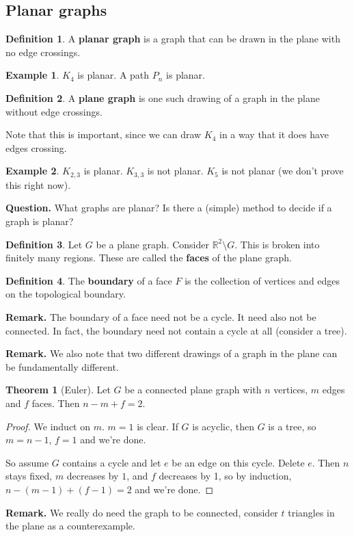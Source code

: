 \documentclass{article}
\theoremstyle{definition}
\newtheorem{theorem}{Theorem}[section]
\newtheorem{example}{Example}[section]
\newtheorem{defn}{Definition}[section]
\begin{document}

\subsection{Planar graphs}

\begin{defn}
    A \textbf{planar graph} is a graph that can be drawn in the plane with no edge crossings.
\end{defn}
\begin{example}
    $K_4$ is planar. A path $P_n$ is planar.
\end{example}
\begin{defn}
    A \textbf{plane graph} is one such drawing of a graph in the plane without edge crossings.
\end{defn}
Note that this is important, since we can draw $K_4$ in a way that it does have edges crossing.
\begin{example}
    $K_{2,3}$ is planar. $K_{3,3}$ is not planar. $K_5$ is not planar (we don't prove this right now).
\end{example}

\textbf{Question.} What graphs are planar? Is there a (simple) method to decide if a graph is planar?

\begin{defn}
    Let $G$ be a plane graph. Consider $\mathbb{R}^2 \setminus G$. This is broken into finitely many regions. These are called the \textbf{faces} of the plane graph.
\end{defn}
\begin{defn}
    The \textbf{boundary} of a face $F$ is the collection of vertices and edges on the topological boundary.
\end{defn}
\textbf{Remark.} The boundary of a face need not be a cycle. It need also not be connected. In fact, the boundary need not contain a cycle at all (consider a tree). 

\textbf{Remark.} We also note that two different drawings of a graph in the plane can be fundamentally different. 

\begin{theorem}[Euler]
    Let $G$ be a connected plane graph with $n$ vertices, $m$ edges and $f$ faces. Then $n-m+f = 2$.
\end{theorem}
\begin{proof}
    We induct on $m$. $m=1$ is clear. If $G$ is acyclic, then $G$ is a tree, so $m=n-1$, $f=1$ and we're done.
    
    So assume $G$ contains a cycle and let $e$ be an edge on this cycle. Delete $e$. Then $n$ stays fixed, $m$ decreases by $1$, and $f$ decreases by 1, so by induction, $n- (m-1) + (f-1) = 2$ and we're done.
\end{proof}
\textbf{Remark.} We really do need the graph to be connected, consider $t$ triangles in the plane as a counterexample.
\end{document}
